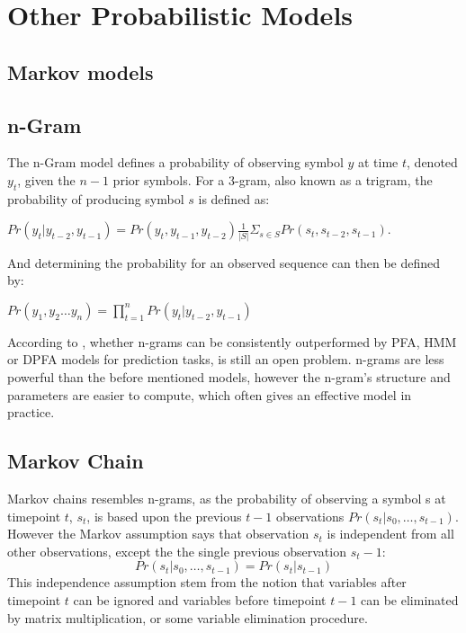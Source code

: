 \section{Other Probabilistic Models}
\subsection{Markov models}

\subsection{n-Gram}
The n-Gram model defines a probability of observing symbol $y$ at time $t$, denoted $y_t$, given the $n-1$ prior symbols. For a 3-gram, also known as a trigram, the probability of producing symbol $s$ is defined as:
\begin{description}
\item $Pr(y_t | y_{t-2}, y_{t-1}) = Pr(y_t, y_{t-1}, y_{t-2}) \frac{1}{|S|}\Sigma_{s \in S} Pr(s_t, s_{t-2}, s_{t-1})$. 
\end{description}
And determining the probability for an observed sequence can then be defined by:
\begin{description}
\item $Pr(y_1, y_2 \dots y_n) = \prod_{t = 1}^{n} Pr(y_t | y_{t-2}, y_{t-1})$ \cite{Notesw4705}
\end{description}
According to \cite{pautomacTR}, whether n-grams can be consistently outperformed by PFA, HMM or DPFA models for prediction tasks, is still an open problem. n-grams are less powerful than the before mentioned models, however the n-gram’s structure and parameters are easier to compute, which often gives an effective model in practice.

\subsection{Markov Chain}
Markov chains resembles n-grams, as the probability of observing a symbol s at timepoint $t$, $s_t$, is based upon the previous $t-1$ observations $Pr(s_t | s_0, \dots ,s_{t-1})$. However the Markov assumption says that observation $s_t$ is independent from all other observations, except the the single previous observation $s_t-1$:
$$Pr(s_t | s_0, \dots ,s_{t-1}) = Pr(s_t | s_{t-1})$$
This independence assumption stem from the notion that variables after timepoint $t$ can be ignored and variables before timepoint $t-1$ can be eliminated by matrix multiplication, or some variable elimination procedure. \cite{poole2010artificial}

